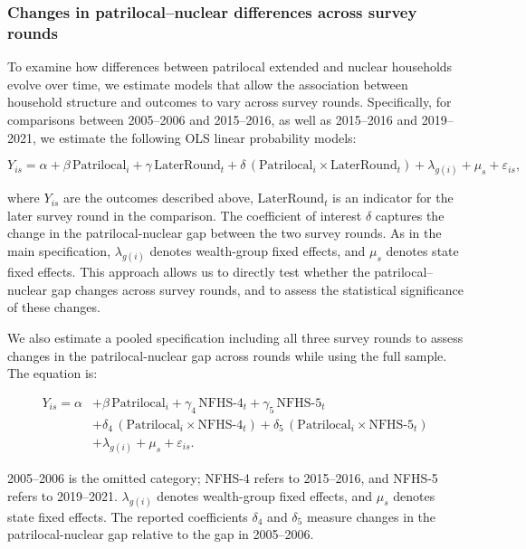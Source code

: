 \documentclass[10pt,twoside,reqno]{article}
\begin{document}
\subsubsection{Changes in patrilocal–nuclear differences across survey rounds}

To examine how differences between patrilocal extended and nuclear households evolve over time, we estimate models that allow the association between household structure and outcomes to vary across survey rounds. Specifically, for comparisons between 2005--2006 and 2015--2016, as well as 2015--2016 and 2019--2021, we estimate the following OLS linear probability models:

\begin{equation} \label{eq:tworounds}
Y_{is} = \alpha + \beta \,\text{Patrilocal}_i + \gamma \,\text{LaterRound}_t
+ \delta \,(\text{Patrilocal}_i \times \text{LaterRound}_t)
+ \lambda_{g(i)} + \mu_s + \varepsilon_{is},
\end{equation}


where $Y_{is}$ are the outcomes described above, $\text{LaterRound}_t$ is an indicator for the later survey round in the comparison. The coefficient of interest $\delta$ captures the change in the patrilocal-nuclear gap between the two survey rounds. As in the main specification, $\lambda_{g(i)}$ denotes wealth-group fixed effects, and $\mu_s$ denotes state fixed effects. This approach allows us to directly test whether the patrilocal–nuclear gap changes across survey rounds, and to assess the statistical significance of these changes.

We also estimate a pooled specification including all three survey rounds to assess changes in the patrilocal-nuclear gap across rounds while using the full sample. The equation is:

\begin{equation} \label{eq:stacked}
\begin{aligned}
Y_{is} = \alpha 
&+ \beta \,\text{Patrilocal}_i
+ \gamma_4 \,\text{NFHS-4}_t
+ \gamma_5 \,\text{NFHS-5}_t \\
&+ \delta_4 \,(\text{Patrilocal}_i \times \text{NFHS-4}_t)
+ \delta_5 \,(\text{Patrilocal}_i \times \text{NFHS-5}_t) \\
&+ \lambda_{g(i)} + \mu_s + \varepsilon_{is}.
\end{aligned}
\end{equation}

2005--2006 is the omitted category; NFHS-4 refers to 2015--2016, and NFHS-5 refers to 2019--2021. $\lambda_{g(i)}$ denotes wealth-group fixed effects, and $\mu_s$ denotes state fixed effects. The reported coefficients $\delta_4$ and $\delta_5$ measure changes in the patrilocal-nuclear gap relative to the gap in 2005--2006.
\end{document}
